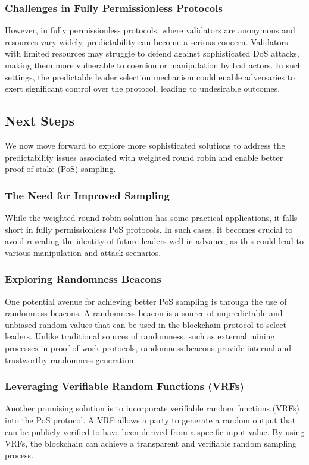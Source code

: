 \subsubsection{Challenges in Fully Permissionless Protocols}
However, in fully permissionless protocols, where validators are anonymous and resources vary widely, predictability can become a serious concern. Validators with limited resources may struggle to defend against sophisticated DoS attacks, making them more vulnerable to coercion or manipulation by bad actors. In such settings, the predictable leader selection mechanism could enable adversaries to exert significant control over the protocol, leading to undesirable outcomes.

\subsection{Next Steps}
We now move forward to explore more sophisticated solutions to address the predictability issues associated with weighted round robin and enable better proof-of-stake (PoS) sampling.

\subsubsection{The Need for Improved Sampling}
While the weighted round robin solution has some practical applications, it falls short in fully permissionless PoS protocols. In such cases, it becomes crucial to avoid revealing the identity of future leaders well in advance, as this could lead to various manipulation and attack scenarios.

\subsubsection{Exploring Randomness Beacons}
One potential avenue for achieving better PoS sampling is through the use of randomness beacons. A randomness beacon is a source of unpredictable and unbiased random values that can be used in the blockchain protocol to select leaders. Unlike traditional sources of randomness, such as external mining processes in proof-of-work protocols, randomness beacons provide internal and trustworthy randomness generation.

\subsubsection{Leveraging Verifiable Random Functions (VRFs)}
Another promising solution is to incorporate verifiable random functions (VRFs) into the PoS protocol. A VRF allows a party to generate a random output that can be publicly verified to have been derived from a specific input value. By using VRFs, the blockchain can achieve a transparent and verifiable random sampling process.

